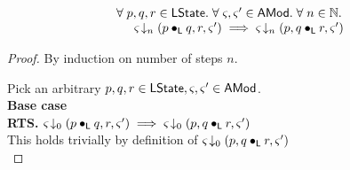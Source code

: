 %
%

%
%
\begin{lemma}\label{lemma:contextSwitch}
%
\[
\begin{array}{l}
	\forall\; p, q, r \in \textsf{LState}.\; \forall\; \varsigma_{}, \varsigma_{}' \in \textsf{AMod}.\; \forall\; n \in \mathbb{N}.\;\\
	\hspace*{0.5cm} \varsigma_{\!}\downarrow_{n} \left(p \bullet_{\textsf{L}} q, r, \varsigma_{}'\right) \implies 
									\varsigma_{\!}\downarrow_{n} \left(p, q \bullet_{\textsf{L}} r, \varsigma_{}'\right)
\end{array}
\]
%
\begin{proof} By induction on number of steps $n$.

\noindent Pick an arbitrary $p, q, r \in \textsf{LState}, \varsigma_{}, \varsigma_{}' \in \textsf{AMod}$.\\

\noindent\textbf{Base case}\\
\textbf{RTS. }\hspace*{0.5cm}$\varsigma_{\!}\downarrow_{0} \left(p \bullet_{\textsf{L}} q, r, \varsigma_{}'\right) \implies \varsigma_{\!}\downarrow_{0} \left(p, q \bullet_{\textsf{L}} r, \varsigma_{}'\right)$\\
This holds trivially by definition of $\varsigma_{\!}\downarrow_{0} \left(p, q \bullet_{\textsf{L}} r, \varsigma_{}'\right)$\\


\end{proof}
\end{lemma}
